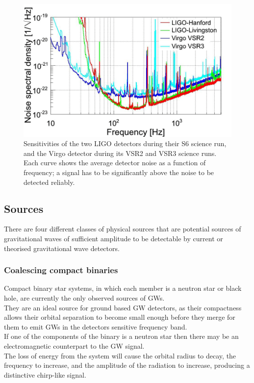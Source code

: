 \documentclass[binding=0.6cm, LaM]{sapthesis}
\begin{document}
		\begin{figure}
                	\includegraphics[scale=0.3]{noiseone}
                	\centering
                	\caption{Sensitivities of the two LIGO detectors during their S6 science run, 
				 and the Virgo detector during its VSR2 and VSR3 science runs. 
				 Each curve shows the average detector noise as a function of frequency; 
				 a signal has to be significantly above the noise to be detected reliably.}
                	\label{fig:noiseone}
                \end{figure}

\subsection{Sources}

	There are four different classes of physical sources 
	that are potential sources of gravitational waves 
	of sufficient amplitude to be detectable 
	by current or theorised gravitational wave detectors. 

\subsubsection{Coalescing compact binaries}

	Compact binary star systems, in which each member is a neutron star or black hole, 
	are currently the only observed sources of GWs. \\
	They are an ideal source for ground based GW detectors, 
	as their compactness allows their orbital separation to become 
	small enough before they merge for them to emit GWs in the detectors sensitive frequency band. \\
	If one of the components of the binary is a neutron star 
	then there may be an electromagnetic counterpart to the GW signal. \\
	The loss of energy from the system will cause the orbital radius to decay, 
	the frequency to increase, and the amplitude of the radiation to increase, 
	producing a distinctive chirp-like signal. 
	
\end{document}
